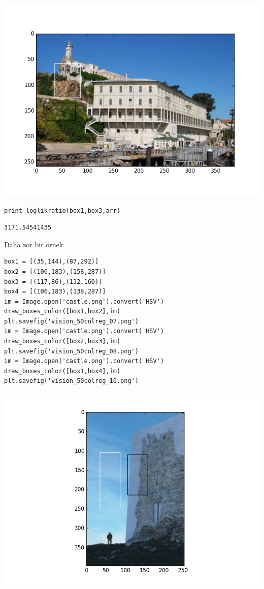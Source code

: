 \documentclass[12pt,fleqn]{article}\usepackage{../../common}
\begin{document}
\includegraphics[height=10cm]{vision_50colreg_06.png}

\begin{verbatim}
print loglikratio(box1,box3,arr)
\end{verbatim}

\begin{verbatim}
3171.54541435
\end{verbatim}

Daha zor bir örnek

\begin{verbatim}
box1 = [(35,144),(87,292)]
box2 = [(106,183),(158,287)]
box3 = [(117,86),(132,160)]
box4 = [(106,183),(138,287)]
im = Image.open('castle.png').convert('HSV')
draw_boxes_color([box1,box2],im)
plt.savefig('vision_50colreg_07.png')
im = Image.open('castle.png').convert('HSV')
draw_boxes_color([box2,box3],im)
plt.savefig('vision_50colreg_08.png')
im = Image.open('castle.png').convert('HSV')
draw_boxes_color([box1,box4],im)
plt.savefig('vision_50colreg_10.png')
\end{verbatim}

\includegraphics[height=10cm]{vision_50colreg_07.png}
\end{document}
